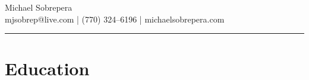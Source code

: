 \documentclass[10pt, letter]{article}
\begin{document}
\begin{center}
    {\LARGE Michael Sobrepera}\\[1mm]
    mjsobrep@live.com  |  (770) 324--6196  |  michaelsobrepera.com
    \end{center}
    \hrule
    \vspace{.4cm}

    \section{Education}
    
\end{document}
